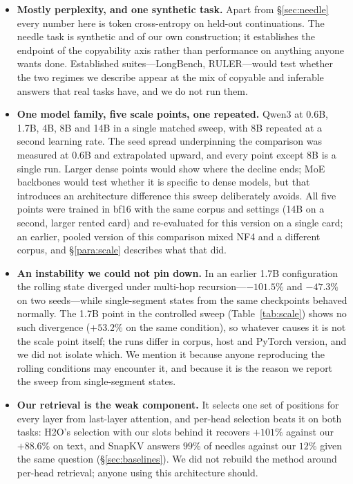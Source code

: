 \documentclass[11pt]{article}
\begin{document}
\begin{itemize}
\item \textbf{Mostly perplexity, and one synthetic task.} Apart from
\S\ref{sec:needle} every number here is token cross-entropy on held-out
continuations. The needle task is synthetic and of our own construction; it
establishes the endpoint of the copyability axis rather than performance on
anything anyone wants done. Established suites---LongBench, RULER---would test
whether the two regimes we describe appear at the mix of copyable and inferable
answers that real tasks have, and we do not run them.
\item \textbf{One model family, five scale points, one repeated.} Qwen3 at
0.6B, 1.7B, 4B, 8B and 14B in a single matched sweep, with 8B repeated at a
second learning rate. The seed spread underpinning the comparison was measured
at 0.6B and extrapolated upward, and every point except 8B is a single run.
Larger dense points would show where the decline ends; MoE backbones would test
whether it is specific to dense models, but that introduces an architecture
difference this sweep deliberately avoids.
All five points were trained in bf16 with the same corpus and settings (14B on
a second, larger rented card) and re-evaluated for this version on a single
card; an earlier, pooled version of this comparison mixed NF4 and a
different corpus, and \S\ref{para:scale} describes what that did.
\item \textbf{An instability we could not pin down.} In an earlier 1.7B
configuration the rolling state diverged under multi-hop recursion---$-101.5\%$
and $-47.3\%$ on two seeds---while single-segment states from the same
checkpoints behaved normally. The 1.7B point in the controlled sweep
(Table~\ref{tab:scale}) shows no such divergence ($+53.2\%$ on the same
condition), so whatever causes it is not the scale point itself; the runs differ
in corpus, host and PyTorch version, and we did not isolate which. We mention it
because anyone reproducing the rolling conditions may encounter it, and because
it is the reason we report the sweep from single-segment states.
\item \textbf{Our retrieval is the weak component.} It selects one set of
positions for every layer from last-layer attention, and per-head selection beats
it on both tasks: H2O's selection with our slots behind it recovers $+101\%$
against our $+88.6\%$ on text, and SnapKV answers $99\%$ of needles against our
$12\%$ given the same question (\S\ref{sec:baselines}). We did not rebuild the
method around per-head retrieval; anyone using this architecture should.

\end{itemize}
\end{document}
